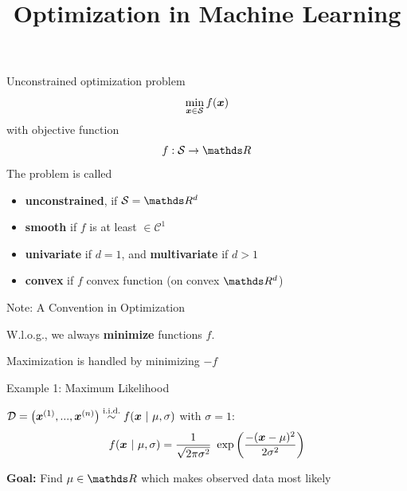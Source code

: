 \documentclass[11pt,compress,t,notes=noshow, xcolor=table]{beamer}
\title{Optimization in Machine Learning}
\begin{document}

\begin{framev}{Unconstrained optimization problem}
$$
\min_{\xv \in \mathcal{S}} \fx
$$
with objective function
$$
f: \mathcal{S} \to \R
$$
The problem is called
\begin{itemize}
\item \textbf{unconstrained}, if $\mathcal{S} = \R^d $
\item \textbf{smooth} if $f$ is at least $\in \mathcal{C}^1$
\item \textbf{univariate} if $d = 1$, and \textbf{multivariate} if $d > 1$
\item \textbf{convex} if $f$ convex function (on convex $\R^d$)
\end{itemize}
\end{framev}


\begin{framei}[sep=L]{Note: A Convention in Optimization}
\item W.l.o.g., we always \textbf{minimize} functions $f$.
\item Maximization is handled by minimizing $-f$
\vfill
{}
{
}
\end{framei}


\begin{framei}{Example 1: Maximum Likelihood}
\item $\D = \left(\xi[1], ..., \xi[n]\right) \overset{\text{i.i.d.}}{\sim} f(\xv ~|~ \mu, \sigma)$ with $\sigma = 1$:
$$ f(\xv ~|~ \mu, \sigma) = \frac{1}{\sqrt{2 \pi \sigma^{2}}}~\exp\left(\frac{-(\xv-\mu)^{2}}{2\sigma^{2}}\right) $$
\item \textbf{Goal:} Find $\mu \in \R$ which makes observed data most likely
\end{framei}
\end{document}
